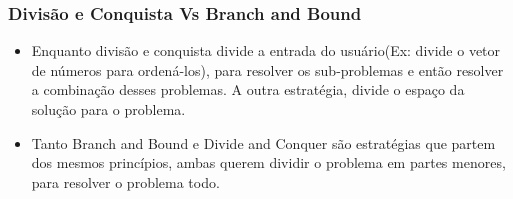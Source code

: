       \subsubsection{Divisão e Conquista Vs Branch and Bound}

      \begin{itemize}
          \item Enquanto divisão e conquista divide a entrada do usuário(Ex: divide o vetor de 
          números para ordená-los), para resolver os sub-problemas e então resolver a combinação
          desses problemas. A outra estratégia, divide o espaço da solução para o problema.
          \item Tanto Branch and Bound e Divide and Conquer são estratégias que partem dos 
          mesmos princípios, ambas querem dividir o problema em partes menores, para resolver 
          o problema todo.
      \end{itemize}

    \nocite{divide-and-conquer}
    \nocite{closest-pair-of-points}
\newpage